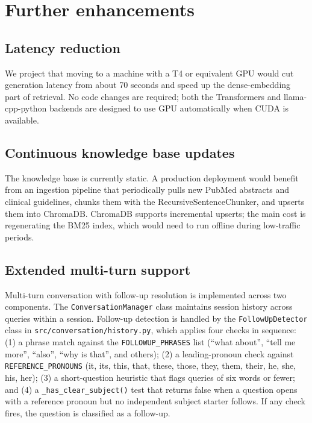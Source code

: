 \section{Further enhancements}

\subsection{Latency reduction}

We project that moving to a machine with a T4 or equivalent GPU would cut generation latency from about 70 seconds and speed up the dense-embedding part of retrieval. No code changes are required; both the Transformers and llama-cpp-python backends are designed to use GPU automatically when CUDA is available.

\subsection{Continuous knowledge base updates}

The knowledge base is currently static. A production deployment would benefit from an ingestion pipeline that periodically pulls new PubMed abstracts and clinical guidelines, chunks them with the RecursiveSentenceChunker, and upserts them into ChromaDB. ChromaDB supports incremental upserts; the main cost is regenerating the BM25 index, which would need to run offline during low-traffic periods.

\subsection{Extended multi-turn support}

Multi-turn conversation with follow-up resolution is implemented across two components. The \texttt{ConversationManager} class maintains session history across queries within a session. Follow-up detection is handled by the \texttt{FollowUpDetector} class in \texttt{src/\allowbreak conversation/history.py}, which applies four checks in sequence: (1) a phrase match against the \texttt{FOLLOWUP\_PHRASES} list (``what about'', ``tell me more'', ``also'', ``why is that'', and others); (2) a leading-pronoun check against \texttt{REFERENCE\_\allowbreak PRONOUNS} (it, its, this, that, these, those, they, them, their, he, she, his, her); (3) a short-question heuristic that flags queries of six words or fewer; and (4) a \texttt{\_has\_clear\_subject()} test that returns false when a question opens with a reference pronoun but no independent subject starter follows. If any check fires, the question is classified as a follow-up.

